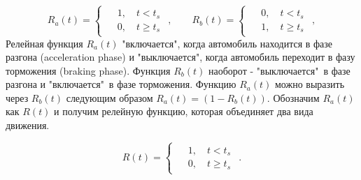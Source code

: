 \documentclass[12pt, a4paper]{extarticle}
\numberwithin{equation}{section}
\begin{document}
\begin{equation*} 
R_{a}(t)=
\begin{cases}
\begin{split}
&1, \quad t<t_{s} \\
&0, \quad t\geq t_{s}
\end{split}
\end{cases},
\qquad
R_{b}(t)=
\begin{cases}
\begin{split}
&0, \quad t<t_{s} \\
&1, \quad t\geq t_{s}
\end{split}
\end{cases},
\end{equation*}
Релейная функция $R_{a}(t)$ "включается"{}, когда автомобиль находится в фазе разгона (acceleration phase) и "выключается"{}, когда автомобиль переходит в фазу торможения (braking phase). Функция $R_{b}(t)$ наоборот - "выключается"\ в фазе разгона и "включается"\ в фазе торможения. Функцию $R_{a}(t)$ можно выразить через $R_{b}(t)$ следующим образом $R_{a}(t) = (1-R_{b}(t))$. Обозначим $R_{a}(t)$ как $R(t)$ и получим релейную функцию, которая объединяет два вида движения.

\begin{equation} \label{relay_function}
R(t)=
\begin{cases}
\begin{split}
&1, \quad t<t_{s} \\
&0, \quad t\geq t_{s}
\end{split}
\end{cases}.
\end{equation}
\end{document}
